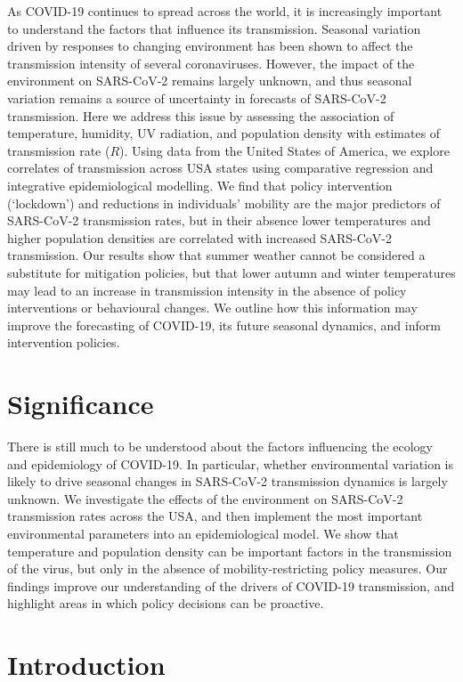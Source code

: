 \documentclass[12pt,english,a4paper]{article}
\newcommand{\virus}{SARS-CoV-2\xspace}
\newcommand{\disease}{COVID-19\xspace}
\begin{document}
As \disease continues to spread across the world, it is increasingly important to understand the factors that influence its transmission. Seasonal variation driven by responses to changing environment has been shown to affect the transmission intensity of several coronaviruses.
However, the impact of the environment on \virus remains largely unknown, and thus seasonal variation remains a source of uncertainty in forecasts of \virus transmission. Here we address this issue by  assessing the association of temperature, humidity, UV radiation, and population density with estimates of transmission rate ($R$). Using data from the United States of America, we explore correlates of transmission across USA states using comparative regression and integrative epidemiological modelling.
We find that policy intervention (`lockdown') and reductions in individuals' mobility are the major predictors of \virus transmission rates, but in their absence lower temperatures and higher population densities are correlated with increased \virus transmission. Our results show that summer weather cannot be considered a substitute for mitigation policies, but that lower autumn and winter temperatures may lead to an increase in transmission intensity in the absence of policy interventions or behavioural changes.
We outline how this information may improve the forecasting of \disease, its future seasonal dynamics, and inform intervention policies.

\clearpage

\section*{Significance}

There is still much to be understood about the factors influencing the ecology and epidemiology of \disease. In particular, whether environmental variation is likely to drive seasonal changes in \virus transmission dynamics is largely unknown. We investigate the effects of the environment on \virus transmission rates across the USA, and then implement the most important environmental parameters into an epidemiological model. We show that temperature and population density can be important factors in the transmission of the virus, but only in the absence of mobility-restricting policy measures. Our findings improve our understanding of the drivers of \disease transmission, and highlight areas in which policy decisions can be proactive.


\clearpage
\section*{Introduction}
\end{document}
